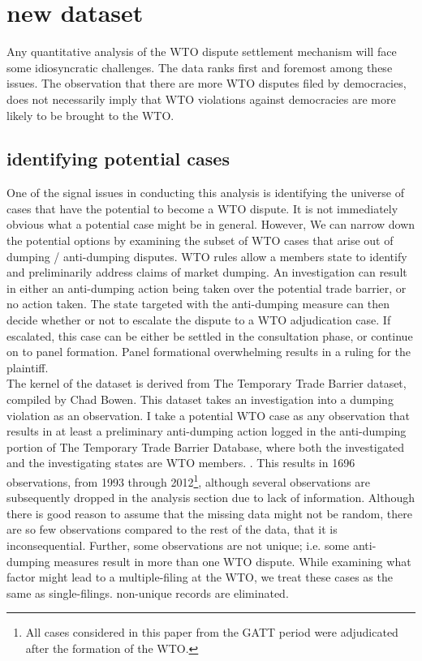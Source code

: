 \documentclass[]{article}
\begin{document}
\section{new dataset}
Any quantitative analysis of the WTO dispute settlement mechanism will face some idiosyncratic challenges. The data ranks first and foremost among these issues.   The observation that there are more WTO disputes filed by democracies, does not necessarily imply that WTO violations against democracies are more likely to be brought to the WTO. 
\subsection{identifying potential cases}
One  of the signal issues in conducting this analysis is identifying the universe of cases that have the potential to become a WTO dispute. It is not immediately obvious what a potential case might be in general. However, We can narrow down the potential options by examining the subset of WTO cases that arise out of dumping / anti-dumping disputes. WTO rules allow a members state to identify and preliminarily address claims of market dumping. An investigation can result in either an anti-dumping action being taken over the potential trade barrier, or no action taken. The state targeted with the anti-dumping measure can then decide whether or not to escalate the dispute to a WTO adjudication case. If escalated, this case can be either be settled in the consultation phase, or continue on to panel formation. Panel formational overwhelming results in a ruling for the plaintiff. \\

The kernel of the dataset is derived from The Temporary Trade Barrier dataset, compiled by Chad Bowen. This dataset takes an investigation into a dumping violation as an observation. I take a potential WTO case as any observation that results in at least a preliminary anti-dumping action logged in the anti-dumping portion of The Temporary Trade Barrier Database, where both the investigated and the investigating states are WTO members. \cite{BADD}. This results in 1696 observations, from 1993 through 2012\footnote{All cases considered in this paper from the GATT period were adjudicated after the formation of the WTO.}, although several observations are subsequently dropped in the analysis section due to lack of information. Although there is good reason to assume that the missing data might not be random, there are so few observations compared to the rest of the data, that it is inconsequential. Further, some observations are not unique; i.e. some anti-dumping measures result in more than one WTO dispute. While examining what factor might lead to a multiple-filing at the WTO, we treat these cases as the same as single-filings. non-unique records are eliminated. 
\end{document}
